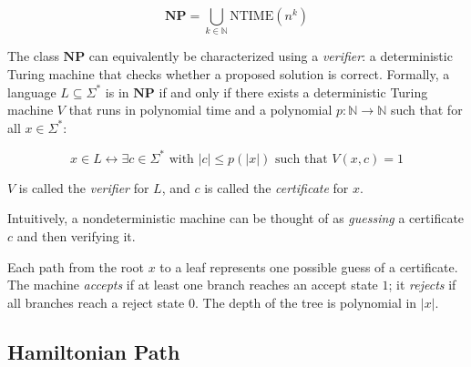 \documentclass[12pt,a4paper,openany]{article}
\begin{document}
\[
\mathbf{NP} = \bigcup_{k \in \mathbb{N}} \text{NTIME}(n^k)
\]

The class $\mathbf{NP}$ can equivalently be characterized using a \emph{verifier}: a deterministic Turing machine that checks whether a proposed solution is correct. Formally, a language $L \subseteq \Sigma^*$ is in $\mathbf{NP}$ if and only if there exists a deterministic Turing machine $V$ that runs in polynomial time and a polynomial $p : \mathbb{N} \to \mathbb{N}$ such that for all $x \in \Sigma^*$:

\[
x \in L \leftrightarrow \exists c \in \Sigma^* \text{ with } |c| \leq p(|x|) \text{ such that } V(x,c) = 1
\]

$V$ is called the \emph{verifier} for $L$, and $c$ is called the \emph{certificate} for $x$.

Intuitively, a nondeterministic machine can be thought of as \emph{guessing} a certificate $c$ and then verifying it. 


\begin{center}
\end{center}

Each path from the root $x$ to a leaf represents one possible guess of a certificate. 
The machine \emph{accepts} if at least one branch reaches an accept state $1$; it \emph{rejects} if all branches reach a reject state $0$. 
The depth of the tree is polynomial in $|x|$.

\subsection{Hamiltonian Path}
\end{document}
